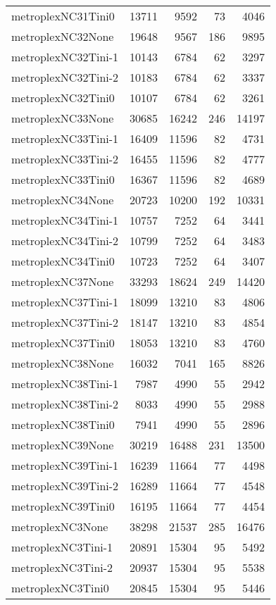 \begin{longtable}{lrrrr}
metroplexNC31Tini0 & 13711 & 9592 & 73 & 4046 \\
metroplexNC32None & 19648 & 9567 & 186 & 9895 \\
metroplexNC32Tini-1 & 10143 & 6784 & 62 & 3297 \\
metroplexNC32Tini-2 & 10183 & 6784 & 62 & 3337 \\
metroplexNC32Tini0 & 10107 & 6784 & 62 & 3261 \\
metroplexNC33None & 30685 & 16242 & 246 & 14197 \\
metroplexNC33Tini-1 & 16409 & 11596 & 82 & 4731 \\
metroplexNC33Tini-2 & 16455 & 11596 & 82 & 4777 \\
metroplexNC33Tini0 & 16367 & 11596 & 82 & 4689 \\
metroplexNC34None & 20723 & 10200 & 192 & 10331 \\
metroplexNC34Tini-1 & 10757 & 7252 & 64 & 3441 \\
metroplexNC34Tini-2 & 10799 & 7252 & 64 & 3483 \\
metroplexNC34Tini0 & 10723 & 7252 & 64 & 3407 \\
metroplexNC37None & 33293 & 18624 & 249 & 14420 \\
metroplexNC37Tini-1 & 18099 & 13210 & 83 & 4806 \\
metroplexNC37Tini-2 & 18147 & 13210 & 83 & 4854 \\
metroplexNC37Tini0 & 18053 & 13210 & 83 & 4760 \\
metroplexNC38None & 16032 & 7041 & 165 & 8826 \\
metroplexNC38Tini-1 & 7987 & 4990 & 55 & 2942 \\
metroplexNC38Tini-2 & 8033 & 4990 & 55 & 2988 \\
metroplexNC38Tini0 & 7941 & 4990 & 55 & 2896 \\
metroplexNC39None & 30219 & 16488 & 231 & 13500 \\
metroplexNC39Tini-1 & 16239 & 11664 & 77 & 4498 \\
metroplexNC39Tini-2 & 16289 & 11664 & 77 & 4548 \\
metroplexNC39Tini0 & 16195 & 11664 & 77 & 4454 \\
metroplexNC3None & 38298 & 21537 & 285 & 16476 \\
metroplexNC3Tini-1 & 20891 & 15304 & 95 & 5492 \\
metroplexNC3Tini-2 & 20937 & 15304 & 95 & 5538 \\
metroplexNC3Tini0 & 20845 & 15304 & 95 & 5446 \\

\end{longtable}

